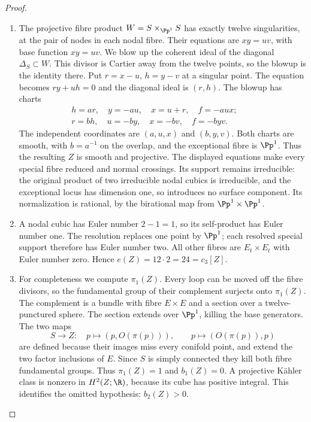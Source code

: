\begin{proof}
\begin{enumerate}[label={$\langle1\rangle$\arabic*.},leftmargin=*]
\item The projective fibre product $W=S\times_{\Pp^1}S$ has exactly
twelve singularities, at the pair of nodes in each nodal fibre.
Their equations are $xy=uv$, with base function $xy=uv$. We blow
up the coherent ideal of the diagonal $\Delta_S\subset W$. This
divisor is Cartier away from the twelve points, so the blowup is
the identity there. Put $r=x-u$, $h=y-v$ at a singular point.
The equation becomes $ry+uh=0$ and the diagonal ideal is $(r,h)$.
The blowup has charts
\label{layout:II:1}
\[
\begin{gathered}
h=ar,\quad y=-au,\quad x=u+r,\quad f=-aux;
 \qquad
 \\
r=bh,\quad u=-by,\quad x=-bv,\quad f=-byv.
\end{gathered}
\]
The independent coordinates are $(a,u,x)$ and $(b,y,v)$.
Both charts are smooth, with $b=a^{-1}$ on the overlap, and the
exceptional fibre is $\Pp^1$. Thus the resulting $Z$ is smooth
and projective. The displayed equations make every special fibre
reduced and normal crossings. Its support remains irreducible:
the original product of two irreducible nodal cubics is irreducible,
and the exceptional locus has dimension one, so introduces no
surface component. Its normalization is rational, by the
birational map from $\Pp^1\times\Pp^1$.

\item A nodal cubic has Euler number $2-1=1$, so its self-product has
Euler number one. The resolution replaces one point by $\Pp^1$;
each resolved special support therefore has Euler number two.
All other fibres are $E_t\times E_t$ with Euler number zero.
Hence $e(Z)=12\cdot2=24=c_3[Z]$.

\item For completeness we compute $\pi_1(Z)$. Every loop can be moved
off the fibre divisors, so the fundamental group of their complement
surjects onto $\pi_1(Z)$. The complement is a bundle with fibre
$E\times E$ and a section over a twelve-punctured sphere. The
section extends over $\Pp^1$, killing the base generators. The
two maps
\[
 S\longrightarrow Z:\quad p\mapsto(p,O(\pi(p))),\qquad
 p\mapsto(O(\pi(p)),p)
\]
are defined because their images miss every conifold point, and
extend the two factor inclusions of $E$. Since $S$ is simply
connected they kill both fibre fundamental groups. Thus
$\pi_1(Z)=1$ and $b_1(Z)=0$. A projective Kähler class is nonzero
in $H^2(Z;\R)$, because its cube has positive integral. This
identifies the omitted hypothesis: $b_2(Z)>0$.

\end{enumerate}
\end{proof}
